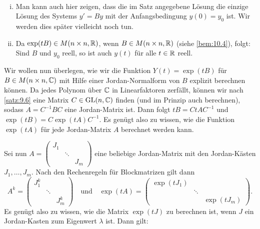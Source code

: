 \begin{bemerkung}
	\label{bem:10.7}
	\mbox{} \\[-1.4cm]
	\begin{enumerate}[(i)]
		\item Man kann auch hier zeigen, dass die im Satz angegebene Lösung die einzige Lösung des Systems $y' = By$ mit der Anfangsbedingung $y(0) = y_0$ ist.
		Wir werden dies später vielleicht noch tun.
		\item Da $\exp(tB) \in M(n \times n,\mathbb{R})$, wenn $B \in M(n \times n,\mathbb{R})$ (siehe \autoref{bem:10.4}), folgt:
		Sind $B$ und $y_0$ reell, so ist auch $y(t)$ für alle $t \in \mathbb{R}$ reell.
	\end{enumerate}
\end{bemerkung}

\begin{anwendung}
	\label{anw:10.8}
	Wir wollen nun überlegen, wie wir die Funktion $Y(t) = \exp(tB)$ für $B \in M(n \times n,\mathbb{C})$ mit Hilfe einer Jordan-Normalform von $B$ explizit berechnen können.
	Da jedes Polynom über $\mathbb{C}$ in Linearfaktoren zerfällt, können wir nach \autoref{satz:9.6} eine Matrix $C \in \operatorname{GL}(n,\mathbb{C})$ finden (und im Prinzip auch berechnen), sodass $A = C^{-1}BC$ eine Jordan-Matrix ist.
	Dann folgt $tB = CtAC^{-1}$ und $\exp(tB) = C \exp(tA)C^{-1}$.
	Es genügt also zu wissen, wie die Funktion $\exp(tA)$ für jede Jordan-Matrix $A$ berechnet werden kann.
	
	Sei nun $A = \begin{pmatrix}
		J_1 & & \\
		& \ddots & \\
		& & J_m
	\end{pmatrix}$ eine beliebige Jordan-Matrix mit den Jordan-Kästen $J_1,\dots,J_m$.
	Nach den Rechenregeln für Blockmatrizen gilt dann
	\[
		A^{k} = \begin{pmatrix}
			J_1^{k} & & \\
			& \ddots & \\
			& & J_m^{k}
		\end{pmatrix} \quad \text{und} \quad \exp(tA) = \begin{pmatrix}
			\exp(tJ_1) & & \\
			& \ddots & \\
			& & \exp(tJ_m)
		\end{pmatrix}.
	\]
	Es genügt also zu wissen, wie die Matrix $\exp(tJ)$ zu berechnen ist, wenn $J$ ein Jordan-Kasten zum Eigenwert $\lambda$ ist.
	Dann gilt:
	

\end{anwendung}
